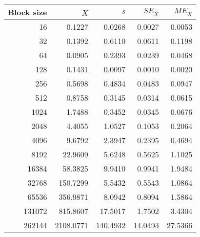 \begin{tabular}{rrrrr}\toprule
{\small Block size} & $\bar{X}$ & $s$ & $SE_{\bar{X}}$ & $ME_{\bar{X}}$ \\\midrule
16 & 0.1227 & 0.0268 & 0.0027 & 0.0053\\
32 & 0.1392 & 0.6110 & 0.0611 & 0.1198\\
64 & 0.0905 & 0.2393 & 0.0239 & 0.0468\\
128 & 0.1431 & 0.0097 & 0.0010 & 0.0020\\
256 & 0.5698 & 0.4834 & 0.0483 & 0.0947\\
512 & 0.8758 & 0.3145 & 0.0314 & 0.0615\\
1024 & 1.7488 & 0.3452 & 0.0345 & 0.0676\\
2048 & 4.4055 & 1.0527 & 0.1053 & 0.2064\\
4096 & 9.6792 & 2.3947 & 0.2395 & 0.4694\\
8192 & 22.9609 & 5.6248 & 0.5625 & 1.1025\\
16384 & 58.3825 & 9.9410 & 0.9941 & 1.9484\\
32768 & 150.7299 & 5.5432 & 0.5543 & 1.0864\\
65536 & 356.9871 & 8.0942 & 0.8094 & 1.5864\\
131072 & 815.8607 & 17.5017 & 1.7502 & 3.4304\\
262144 & 2108.0771 & 140.4932 & 14.0493 & 27.5366\\
\bottomrule
\end{tabular}
